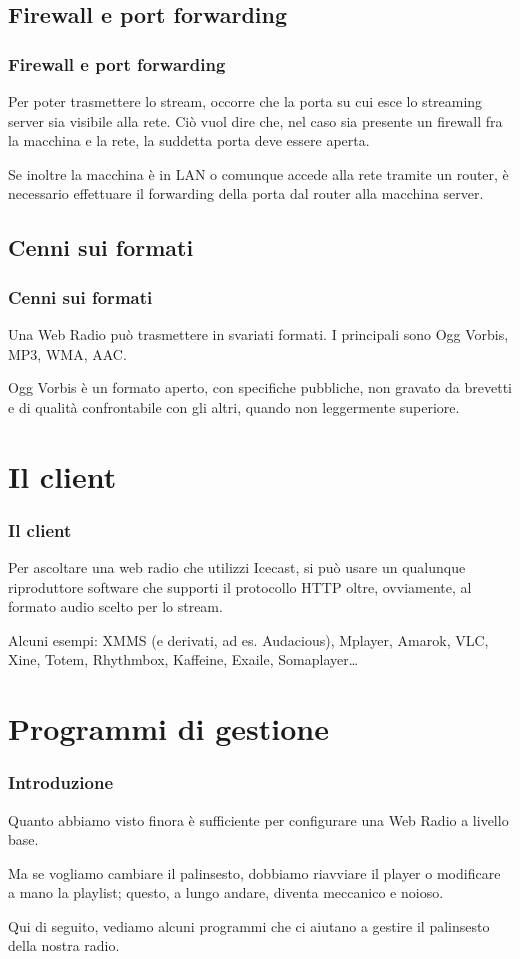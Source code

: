\documentclass{beamer}
\begin{document}
\subsection{Firewall e port forwarding}

\begin{frame}\frametitle{Firewall e port forwarding}
Per poter trasmettere lo stream, occorre che la porta su cui esce lo
streaming server sia visibile alla rete. Ciò vuol dire che, nel caso
sia presente un firewall fra la macchina e la rete, la suddetta porta
deve essere aperta.

Se inoltre la macchina è in LAN o comunque accede alla rete tramite un
router, è necessario effettuare il forwarding della porta dal router
alla macchina server.
\end{frame}

\subsection{Cenni sui formati}

\begin{frame}\frametitle{Cenni sui formati}
Una Web Radio può trasmettere in svariati formati. I principali sono
Ogg Vorbis, MP3, WMA, AAC.

Ogg Vorbis è un formato aperto, con specifiche pubbliche, non gravato
da brevetti e di qualità confrontabile con gli altri, quando non
leggermente superiore.
\end{frame}

\section{Il client}

\begin{frame}\frametitle{Il client}
Per ascoltare una web radio che utilizzi Icecast, si può usare un
qualunque riproduttore software che supporti il protocollo HTTP oltre,
ovviamente, al formato audio scelto per lo stream.

Alcuni esempi: XMMS (e derivati, ad es. Audacious), Mplayer, Amarok,
VLC, Xine, Totem, Rhythmbox, Kaffeine, Exaile, Somaplayer{\ldots}
\end{frame}

\section{Programmi di gestione}

\begin{frame}\frametitle{Introduzione}
Quanto abbiamo visto finora è sufficiente per configurare una Web
Radio a livello base.

Ma se vogliamo cambiare il palinsesto, dobbiamo riavviare il player o
modificare a mano la playlist; questo, a lungo andare, diventa
meccanico e noioso.

Qui di seguito, vediamo alcuni programmi che ci aiutano a gestire il
palinsesto della nostra radio.
\end{frame}
\end{document}
